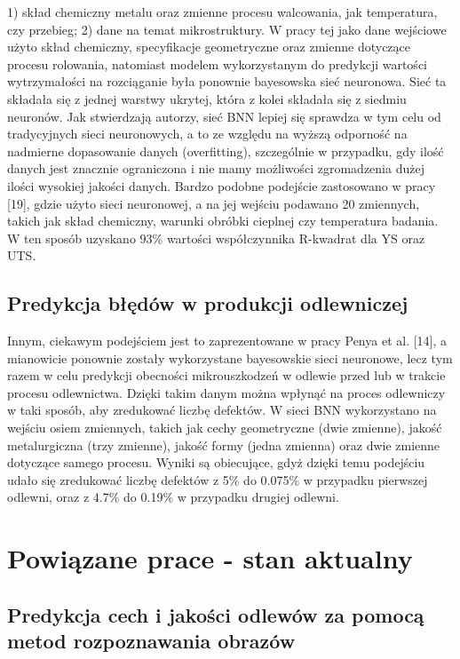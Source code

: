 1) skład chemiczny metalu oraz zmienne procesu walcowania, jak temperatura, czy przebieg;
2) dane na temat mikrostruktury. 
W pracy tej jako dane wejściowe użyto skład chemiczny, specyfikacje geometryczne oraz zmienne dotyczące procesu rolowania, natomiast modelem wykorzystanym do predykcji wartości wytrzymałości na rozciąganie była ponownie bayesowska sieć neuronowa. Sieć ta składała się z jednej warstwy ukrytej, która z kolei składała się z siedmiu neuronów. Jak stwierdzają autorzy, sieć BNN lepiej się sprawdza w tym celu od tradycyjnych sieci neuronowych, a to ze względu na wyższą odporność na nadmierne dopasowanie danych (overfitting), szczególnie w przypadku, gdy ilość danych jest znacznie ograniczona i nie mamy możliwości zgromadzenia dużej ilości wysokiej jakości danych.
    Bardzo podobne podejście zastosowano w pracy [19], gdzie użyto sieci neuronowej, a na jej wejściu podawano 20 zmiennych, takich jak skład chemiczny, warunki obróbki cieplnej czy temperatura badania. W ten sposób uzyskano 93\% wartości współczynnika R-kwadrat dla YS oraz UTS.

\subsection{Predykcja błędów w produkcji odlewniczej}
\label{cha2.1.3}

Innym, ciekawym podejściem jest to zaprezentowane w pracy Penya et al. [14], a mianowicie ponownie zostały wykorzystane bayesowskie sieci neuronowe, lecz tym razem w celu predykcji obecności mikrouszkodzeń w odlewie przed lub w trakcie procesu odlewnictwa. Dzięki takim danym można wpłynąć na proces odlewniczy w taki sposób, aby zredukować liczbę defektów. W sieci BNN wykorzystano na wejściu osiem zmiennych, takich jak cechy geometryczne (dwie zmienne), jakość metalurgiczna (trzy zmienne), jakość formy (jedna zmienna) oraz dwie zmienne dotyczące samego procesu. Wyniki są obiecujące, gdyż dzięki temu podejściu udało się zredukować liczbę defektów z 5\% do 0.075\% w przypadku pierwszej odlewni, oraz z 4.7\% do 0.19\% w przypadku drugiej odlewni.

\section{Powiązane prace - stan aktualny}
\label{cha2.2}

\subsection{Predykcja cech i jakości odlewów za pomocą metod rozpoznawania obrazów}
\label{cha2.2.1}

